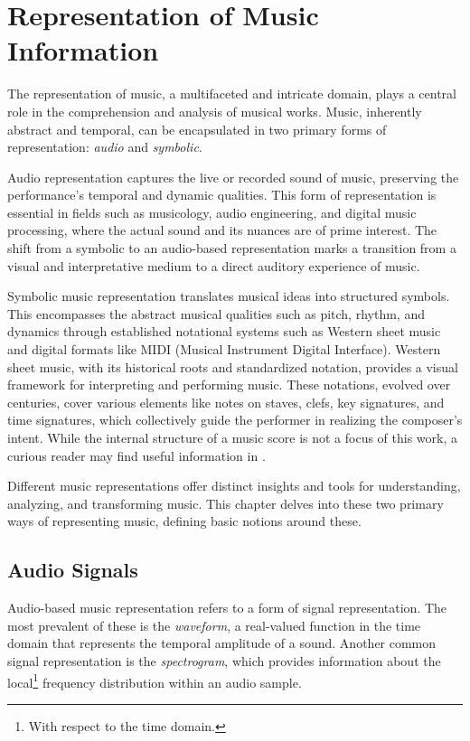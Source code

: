 \chapter{Representation of Music Information}

The representation of music, a multifaceted and intricate domain, plays a central role in the comprehension and analysis of musical works. Music, inherently abstract and temporal, can be encapsulated in two primary forms of representation: \emph{audio} and \emph{symbolic}.

Audio representation captures the live or recorded sound of music, preserving the performance's temporal and dynamic qualities. This form of representation is essential in fields such as musicology, audio engineering, and digital music processing, where the actual sound and its nuances are of prime interest. The shift from a symbolic to an audio-based representation marks a transition from a visual and interpretative medium to a direct auditory experience of music.

Symbolic music representation translates musical ideas into structured symbols. This encompasses the abstract musical qualities such as pitch, rhythm, and dynamics through established notational systems such as Western sheet music and digital formats like MIDI (Musical Instrument Digital Interface). Western sheet music, with its historical roots and standardized notation, provides a visual framework for interpreting and performing music. These notations, evolved over centuries, cover various elements like notes on staves, clefs, key signatures, and time signatures, which collectively guide the performer in realizing the composer's intent. While the internal structure of a music score is not a focus of this work, a curious reader may find useful information in \cite{Read1969}.

Different music representations offer distinct insights and tools for understanding, analyzing, and transforming music. This chapter delves into these two primary ways of representing music, defining basic notions around these.

\section{Audio Signals}

Audio-based music representation refers to a form of signal representation. The most prevalent of these is the \emph{waveform}, a real-valued function in the time domain that represents the temporal amplitude of a sound. Another common signal representation is the \emph{spectrogram}, which provides information about the local\footnote{With respect to the time domain.} frequency distribution within an audio sample.

